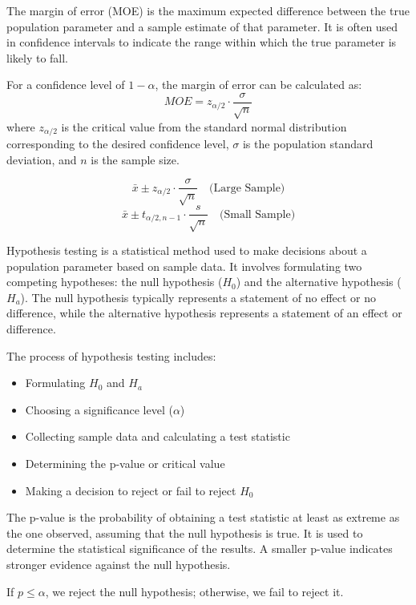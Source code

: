 \documentclass[answers,12pt,addpoints]{exam}
\begin{document}
\begin{remark}
    The margin of error (MOE) is the maximum expected difference between the true population parameter and a sample estimate of that parameter. It is often used in confidence intervals to indicate the range within which the true parameter is likely to fall.

    For a confidence level of $1 - \alpha$, the margin of error can be calculated as:
    \[
    MOE = z_{\alpha/2} \cdot \frac{\sigma}{\sqrt{n}}
    \]
    where $z_{\alpha/2}$ is the critical value from the standard normal distribution corresponding to the desired confidence level, $\sigma$ is the population standard deviation, and $n$ is the sample size.
\end{remark}

\begin{remark}
    \[
    \bar{x} \pm z_{\alpha/2} \cdot \frac{\sigma}{\sqrt{n}} \quad \text{(Large Sample)}
    \]
    \[
    \bar{x} \pm t_{\alpha/2, n-1} \cdot \frac{s}{\sqrt{n}} \quad \text{(Small Sample)}
    \]
\end{remark}

\begin{definition}
    Hypothesis testing is a statistical method used to make decisions about a population parameter based on sample data. It involves formulating two competing hypotheses: the null hypothesis ($H_0$) and the alternative hypothesis ($H_a$). The null hypothesis typically represents a statement of no effect or no difference, while the alternative hypothesis represents a statement of an effect or difference.

    The process of hypothesis testing includes:
    \begin{itemize}
        \item Formulating $H_0$ and $H_a$
        \item Choosing a significance level ($\alpha$)
        \item Collecting sample data and calculating a test statistic
        \item Determining the p-value or critical value
        \item Making a decision to reject or fail to reject $H_0$
    \end{itemize}
    
\end{definition}

\begin{definition}[P-value]
    The p-value is the probability of obtaining a test statistic at least as extreme as the one observed, assuming that the null hypothesis is true. It is used to determine the statistical significance of the results. A smaller p-value indicates stronger evidence against the null hypothesis.

    If $p \leq \alpha$, we reject the null hypothesis; otherwise, we fail to reject it.
    
\end{definition}
\end{document}
